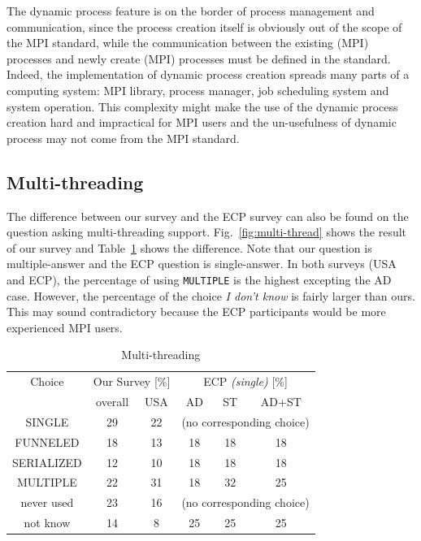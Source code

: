 \documentclass[preprint,5p,times]{elsarticle}
\def\myquote#1{{\it #1}}
\begin{document}
The dynamic process feature is on the
border of process management and communication, since the process
creation itself is obviously out of the scope of the MPI standard,
while the communication between the existing (MPI) processes and newly
create (MPI) processes must be defined in the standard. Indeed, the
implementation of dynamic process creation spreads many parts of a
computing system: MPI library, process manager, job scheduling system
and system operation. This complexity might make the use of the
dynamic process creation hard and impractical for MPI users and the
un-usefulness of dynamic process may not come from the MPI standard.

\subsection{Multi-threading}\label{sec:mutil-threading}

The difference between our survey and the ECP survey can also be found on
the question asking multi-threading support. Fig.~\ref{fig:multi-thread}
shows the result of our survey and Table~\ref{tab:multi-thread} shows
the difference. Note that our question is multiple-answer and the ECP
question is single-answer. In both surveys (USA and ECP), the
percentage of using {\tt MULTIPLE} is the highest excepting the AD
case. However, the percentage of the choice \myquote{I don't know}
is fairly larger than ours. This may sound contradictory because the
ECP participants would be more experienced MPI users.

\begin{table}[htb]%
  \small%
  \begin{center}%
    \caption{Multi-threading}\label{tab:multi-thread}%
    \begin{tabular}{c||c|c||c|c|c}%
      \hline%
      Choice & \multicolumn{2}{c||}{Our Survey [\%]} &
      \multicolumn{3}{c}{ECP {\it(single)} [\%]} \\
      \cline{2-6}%
      & overall & USA & AD & ST & AD+ST \\
      \hline%
      SINGLE & 29 & 22 & \multicolumn{3}{c}{\scriptsize (no corresponding choice)} \\
      FUNNELED & 18 & 13 & 18 & 18 & 18 \\
      SERIALIZED & 12 & 10 & 18 & 18 & 18 \\
      MULTIPLE & 22 & 31 & 18 & 32 & 25 \\
      never used & 23 & 16 & \multicolumn{3}{c}{\scriptsize (no corresponding choice)} \\
      not know & 14 & 8 & 25 & 25 & 25\\
      \hline%
    \end{tabular}%
  \end{center}%
\end{table}%
\end{document}
